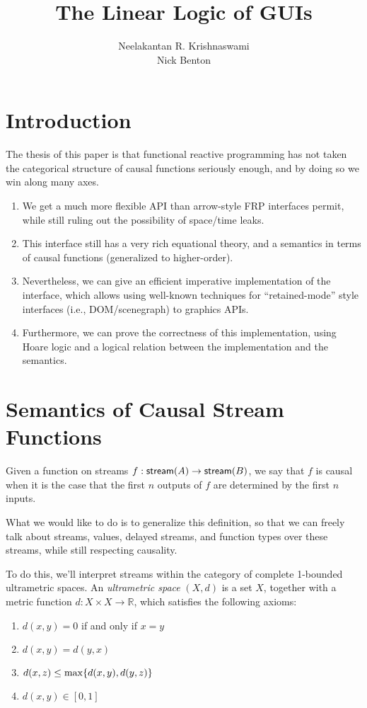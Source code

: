 \documentclass{article}
\title{The Linear Logic of GUIs}
\author{Neelakantan R. Krishnaswami \\ Nick Benton}
\begin{document}
\section{Introduction}

The thesis of this paper is that functional reactive programming has not taken the 
categorical structure of causal functions seriously enough, and by doing so we win 
along many axes. 

\begin{enumerate}
\item We get a much more flexible API than arrow-style FRP interfaces
  permit, while still ruling out the possibility of space/time leaks.

\item This interface still has a very rich equational theory, and a
  semantics in terms of causal functions (generalized to higher-order). 

\item Nevertheless, we can give an efficient imperative implementation of the 
  interface, which allows using well-known techniques for ``retained-mode''
  style interfaces (i.e., DOM/scenegraph) to graphics APIs.  

\item Furthermore, we can prove the correctness of this implementation, using
  Hoare logic and a logical relation between the implementation and the semantics. 
\end{enumerate}

\section{Semantics of Causal Stream Functions}

Given a function on streams $f : \mathsf{stream}({A}) \to \mathsf{stream}({B})$, we say
that $f$ is causal when it is the case that the first $n$ outputs of
$f$ are determined by the first $n$ inputs. 

What we would like to do is to generalize this definition, so that we
can freely talk about streams, values, delayed streams, and function
types over these streams, while still respecting causality.

To do this, we'll interpret streams within the category of complete
1-bounded ultrametric spaces. An \emph{ultrametric space} $(X, d)$ is
a set $X$, together with a metric function $d : X \times X \to \mathbb{R}$,
 which satisfies the following axioms:

 \begin{enumerate}
   \item $d(x, y) = 0$ if and only if $x = y$
   \item $d(x, y) = d(y, x)$
   \item $d(x, z) \leq \max \{{d(x, y), d(y, z)}\}$
   \item $d(x, y) \in [0,1]$
 \end{enumerate}
 
\end{document}
